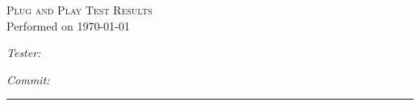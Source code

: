 \documentclass{article}
\newcommand{\testerName}{}
\newcommand{\commitHash}{}
\begin{document}
\begin{titlepage}
\begin{center}
\textsc{\huge Plug and Play Test Results} \\ [0.25cm]
\Large Performed on \today \\ [0.5cm]

\begin{minipage}[t]{0.4\textwidth}
\large \emph{Tester:} \\ \testerName
\end{minipage}
\begin{minipage}[t]{0.4\textwidth}
\raggedleft\large\emph{Commit:} \\ \commitHash
\end{minipage}

\vspace{0.5cm}\hrule

\end{center}
\end{titlepage}
\end{document}
